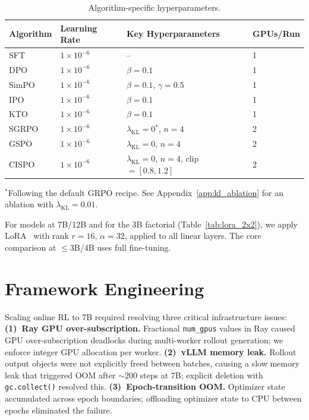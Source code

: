 \documentclass{article}
\begin{document}
\begin{table}[ht]
\centering
\caption{Algorithm-specific hyperparameters.}
\small
\begin{tabular}{@{}llll@{}}
\toprule
\textbf{Algorithm} & \textbf{Learning Rate} & \textbf{Key Hyperparameters} & \textbf{GPUs/Run} \\
\midrule
SFT & $1\!\times\!10^{-6}$ & -- & 1 \\
DPO & $1\!\times\!10^{-6}$ & $\beta = 0.1$ & 1 \\
SimPO & $1\!\times\!10^{-6}$ & $\beta = 0.1$, $\gamma = 0.5$ & 1 \\
IPO & $1\!\times\!10^{-6}$ & $\beta = 0.1$ & 1 \\
KTO & $1\!\times\!10^{-6}$ & $\beta = 0.1$ & 1 \\
SGRPO & $1\!\times\!10^{-6}$ & $\lambda_{\text{KL}} = 0$$^*$, $n = 4$ & 2 \\
GSPO & $1\!\times\!10^{-6}$ & $\lambda_{\text{KL}} = 0$, $n = 4$ & 2 \\
CISPO & $1\!\times\!10^{-6}$ & $\lambda_{\text{KL}} = 0$, $n = 4$, clip $= [0.8, 1.2]$ & 2 \\
\bottomrule
\end{tabular}
\vspace{2pt}
{\footnotesize $^*$Following the default GRPO recipe. See Appendix~\ref{app:kl_ablation} for an ablation with $\lambda_{\text{KL}} = 0.01$.}
\end{table}

For models at 7B/12B and for the 3B factorial (Table~\ref{tab:lora_2x2}), we apply LoRA~\citep{hu2022lora} with rank $r=16$, $\alpha=32$, applied to all linear layers. The core comparison at $\leq$3B/4B uses full fine-tuning.

\section{Framework Engineering}
\label{app:framework_eng}

Scaling online RL to 7B required resolving three critical infrastructure issues:
\textbf{(1)~Ray GPU over-subscription.} Fractional \texttt{num\_gpus} values in Ray caused GPU over-subscription deadlocks during multi-worker rollout generation; we enforce integer GPU allocation per worker.
\textbf{(2)~vLLM memory leak.} Rollout output objects were not explicitly freed between batches, causing a slow memory leak that triggered OOM after ${\sim}$200 steps at 7B; explicit deletion with \texttt{gc.collect()} resolved this.
\textbf{(3)~Epoch-transition OOM.} Optimizer state accumulated across epoch boundaries; offloading optimizer state to CPU between epochs eliminated the failure.
\end{document}
